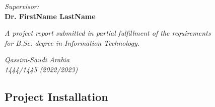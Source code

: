 \documentclass[11pt,a4paper]{report}
\newcommand{\supervisorname}{\textbf{Dr. FirstName LastName}}
\begin{document}
\begin{titlepage}
\begin{center}
    \vspace{3cm}
    \Large
    \textit{Supervisor:}\\
    {\supervisorname}
    
  \end{center}
  \vfill
  \begin{center}  
    \textit{A project report submitted in partial fulfillment of the requirements \\
    for B.Sc. degree in Information Technology.}
    \vspace{5mm}
    
    \textit{Qassim-Saudi Arabia\\
    1444/1445 (2022/2023)}
    
  \end{center}
\end{titlepage}

\vspace*{2cm}






\tableofcontents
\clearpage

\listoffigures
\clearpage

\listoftables
\clearpage

\printacronyms[include=abbrev,name=Abbreviations]

\pagebreak
{}
 
 
 

       




\begin{appendices}
  \chapter{Project Installation}
\end{appendices}
\clearpage


\end{document}
